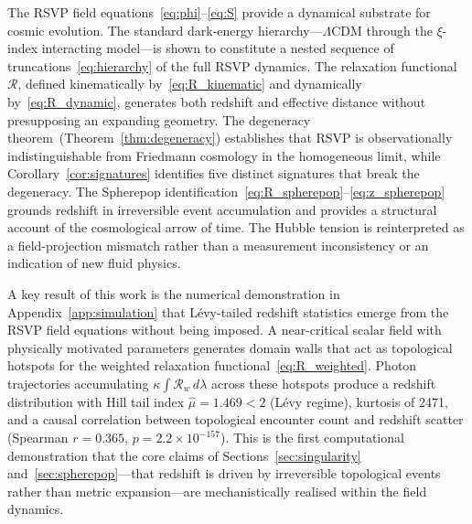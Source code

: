 \documentclass[12pt,a4paper]{article}
\theoremstyle{remark}
\newcommand{\Rcal}{\mathcal{R}}
\begin{document}
The RSVP field equations~\eqref{eq:phi}--\eqref{eq:S} provide a dynamical substrate for cosmic evolution. The standard dark-energy hierarchy---$\Lambda$CDM through the $\xi$-index interacting model---is shown to constitute a nested sequence of truncations~\eqref{eq:hierarchy} of the full RSVP dynamics. The relaxation functional $\Rcal$, defined kinematically by~\eqref{eq:R_kinematic} and dynamically by~\eqref{eq:R_dynamic}, generates both redshift and effective distance without presupposing an expanding geometry. The degeneracy theorem~(Theorem~\ref{thm:degeneracy}) establishes that RSVP is observationally indistinguishable from Friedmann cosmology in the homogeneous limit, while Corollary~\ref{cor:signatures} identifies five distinct signatures that break the degeneracy. The Spherepop identification~\eqref{eq:R_spherepop}--\eqref{eq:z_spherepop} grounds redshift in irreversible event accumulation and provides a structural account of the cosmological arrow of time. The Hubble tension is reinterpreted as a field-projection mismatch rather than a measurement inconsistency or an indication of new fluid physics.

A key result of this work is the numerical demonstration in Appendix~\ref{app:simulation} that Lévy-tailed redshift statistics emerge from the RSVP field equations without being imposed. A near-critical scalar field with physically motivated parameters generates domain walls that act as topological hotspots for the weighted relaxation functional~\eqref{eq:R_weighted}. Photon trajectories accumulating $\kappa\!\int\!\mathcal{R}_w\,d\lambda$ across these hotspots produce a redshift distribution with Hill tail index $\hat{\mu} = 1.469 < 2$ (Lévy regime), kurtosis of 2471, and a causal correlation between topological encounter count and redshift scatter (Spearman $r = 0.365$, $p = 2.2\times10^{-157}$). This is the first computational demonstration that the core claims of Sections~\ref{sec:singularity} and~\ref{sec:spherepop}---that redshift is driven by irreversible topological events rather than metric expansion---are mechanistically realised within the field dynamics.
\end{document}

